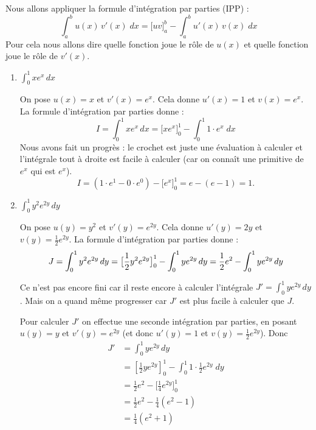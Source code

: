 \documentclass[11pt,class=report,crop=false]{standalone}
\begin{document}

Nous allons appliquer la formule d'intégration par parties (IPP) :
$$\int_a^b u(x) \, v'(x)\;dx= \big[uv\big]_a^b - \int_a^b u'(x) \, v(x)\;dx$$
Pour cela nous allons dire quelle fonction joue le rôle de $u(x)$ et quelle fonction joue le rôle de $v'(x)$.


\begin{enumerate}
\item $\int  _{0} ^{1} xe^{x}\,dx$ 

On pose $u(x) = x$ et $v'(x) = e^x$.
Cela donne $u'(x) = 1$ et $v(x) = e^x$.
La formule d'intégration par parties donne :
$$I = \int  _{0} ^{1} xe^{x}\,dx = \big[xe^x\big]_0^1 - \int_0^1 1 \cdot e^x \;dx$$
Nous avons fait un progrès : le crochet est juste une évaluation à calculer et l'intégrale 
tout à droite est facile à calculer (car on connaît une primitive de $e^x$ qui est $e^x$). 
$$I = \left( 1\cdot e^1 - 0\cdot e^0\right) - \big[e^x\big]_0^1  = e - (e-1) = 1.$$

\item $\int  _{0} ^{1} y^{2}e^{2y} \,dy$

On pose $u(y) = y^2$ et $v'(y) = e^{2y}$.
Cela donne $u'(y) = 2y$ et $v(y) = \frac12e^{2y}$.
La formule d'intégration par parties donne :
$$
J = \int  _{0} ^{1} y^{2}e^{2y} \,dy \\
  = \big[\frac12 y^2 e^{2y}\big]_0^1 - \int  _{0} ^{1} ye^{2y} \,dy \\
  = \frac12 e^2 - \int  _{0} ^{1} ye^{2y} \,dy \\
$$

Ce n'est pas encore fini car il reste encore à calculer l'intégrale 
$J' = \int  _{0} ^{1} ye^{2y} \,dy$.
Mais on a quand même progresser car $J'$ est plus facile à calculer que $J$.

Pour calculer $J'$ on effectue une seconde intégration par parties, en posant 
$u(y) = y$ et $v'(y) = e^{2y}$ (et donc $u'(y) = 1$ et $v(y) = \frac12e^{2y}$).
Donc 
\begin{align*}
J' 
  &= \int  _{0} ^{1} ye^{2y} \,dy \\
  &= \left[\frac12ye^{2y}\right]_0^1 - \int_0^1 1 \cdot \frac12e^{2y} \;dy \\
  &= \frac12e^2 - \big[\frac14e^{2y}\big]_0^1 \\
  &= \frac12e^2 - \frac14(e^2-1) \\
  &= \frac14(e^2 + 1) \\
\end{align*}


\end{enumerate}
\end{document}
